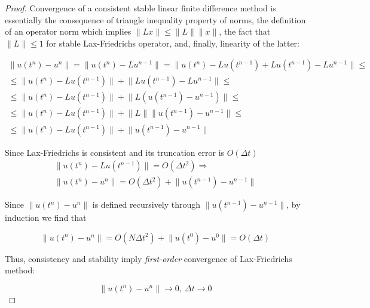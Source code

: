 \documentclass[a4paper]{amsproc}
\theoremstyle{plain}
\theoremstyle{definition}
\theoremstyle{remark}
\numberwithin{equation}{section}
\renewcommand{\le}{\leqslant}\renewcommand{\leq}{\leqslant}
\providecommand{\norm}[1]{\lVert#1 \rVert}
\begin{document}
\begin{proof}
Convergence of a consistent stable linear finite difference method is essentially the consequence of triangle inequality property of norms, the definition of an operator norm which implies $ \norm{Lx} \le \norm{L}\norm{x}$, the fact that $\norm{L} \le 1 $ for stable Lax-Friedrichs operator, and, finally, linearity of the latter:

 \begin{multline} 
 \norm{u(t^n) - u^n} = \norm{u(t^n) - Lu^{n-1}} = \norm{u(t^n) - Lu(t^{n-1}) + Lu(t^{n-1})- Lu^{n-1}} \le \\
 \le \norm{u(t^n) - Lu(t^{n-1})} + \norm{Lu(t^{n-1})- Lu^{n-1}} \le \\ \le \norm{u(t^n) - Lu(t^{n-1})} + \norm{L(u(t^{n-1})- u^{n-1})} \le \\
 \le \norm{u(t^n) - Lu(t^{n-1})} + \norm{L}\norm{u(t^{n-1})- u^{n-1}} \le \\ \le \norm{u(t^n) - Lu(t^{n-1})} + \norm{u(t^{n-1})- u^{n-1}}
 \end{multline}
 
 Since Lax-Friedrichs is consistent and its truncation error is $O(\Delta t)$ \begin{multline} \norm{u(t^n) - Lu(t^{n-1})} = O(\Delta t^2) \Longrightarrow \\
 \norm{u(t^n) - u^n} = O(\Delta t^2) + \norm{u(t^{n-1})- u^{n-1}} \end{multline} 
 
 Since $ \norm{u(t^n) - u^n} $ is defined recursively through $\norm{u(t^{n-1})- u^{n-1}}$, by induction we find that 
 
 $$ \norm{u(t^n) - u^n} = O(N\Delta t^2) + \norm{u(t^0) - u^0} = O(\Delta t)$$
 
 Thus, consistency and stability imply \emph{first-order} convergence of Lax-Friedrichs method:
 
 $$ \norm{u(t^n) - u^n} \longrightarrow 0, ~\Delta t \longrightarrow 0 $$
 
\end{proof}


% 
% 
% 
% 
\end{document}
